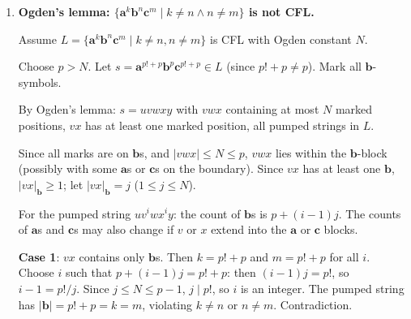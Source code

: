 \begin{enumerate}[{10.}1. ]
\begin{enumerate}
States $\{q_0,q_c,q_a,q_f\}$. Stack alphabet $\{Z,A\}$.

From $q_0$: if first symbol is $\pmb{c}$, go to $q_c$ (push $A$); if first is $\pmb{a}$, go to $q_a$ (push $A$).

$q_c$: push $A$ for each $\pmb{c}$; pop $A$ for each $\pmb{b}$; accept when stack has $Z$ and input done.

$q_a$: push $A$ for each $\pmb{a}$; when $\pmb{b}$ comes, pop two $A$s per $\pmb{b}$; accept when stack has $Z$ and input done.

\item Define $h: \{\pmb{a},\pmb{b},\pmb{c}\}^* \to \{\pmb{a},\pmb{b}\}^*$ by $h(\pmb{a})=\pmb{a}$, $h(\pmb{b})=\pmb{b}$, $h(\pmb{c})=\pmb{a}$. Then:
$h(\{\pmb{c}^n\pmb{b}^m\mid n=m\}) = \{\pmb{a}^n\pmb{b}^n\mid n\geq 1\}$ and $h(\{\pmb{a}^n\pmb{b}^m\mid n=2m\}) = \{\pmb{a}^n\pmb{b}^m\mid n=2m\}$.
$h(L) = \{\pmb{a}^n\pmb{b}^n\}\cup\{\pmb{a}^n\pmb{b}^m\mid n=2m\}$. This language is not a DCFL (it can be shown that any DPDA accepting it would have conflicting behavior on some strings).
\end{enumerate}

\item \textbf{Ogden's lemma: $\{\pmb{a}^k\pmb{b}^n\pmb{c}^m \mid k\neq n \wedge n\neq m\}$ is not CFL.}

Assume $L = \{\pmb{a}^k\pmb{b}^n\pmb{c}^m \mid k\neq n, n\neq m\}$ is CFL with Ogden constant $N$.

Choose $p > N$. Let $s = \pmb{a}^{p!+p}\pmb{b}^p\pmb{c}^{p!+p} \in L$ (since $p!+p \neq p$). Mark all $\pmb{b}$-symbols.

By Ogden's lemma: $s = uvwxy$ with $vwx$ containing at most $N$ marked positions, $vx$ has at least one marked position, all pumped strings in $L$.

Since all marks are on $\pmb{b}$s, and $|vwx|\leq N \leq p$, $vwx$ lies within the $\pmb{b}$-block (possibly with some $\pmb{a}$s or $\pmb{c}$s on the boundary). Since $vx$ has at least one $\pmb{b}$, $|vx|_{\pmb{b}} \geq 1$; let $|vx|_{\pmb{b}} = j$ ($1\leq j\leq N$).

For the pumped string $uv^i wx^i y$: the count of $\pmb{b}$s is $p + (i-1)j$. The counts of $\pmb{a}$s and $\pmb{c}$s may also change if $v$ or $x$ extend into the $\pmb{a}$ or $\pmb{c}$ blocks.

\textbf{Case 1}: $vx$ contains only $\pmb{b}$s. Then $k = p!+p$ and $m = p!+p$ for all $i$. Choose $i$ such that $p + (i-1)j = p!+p$: then $(i-1)j = p!$, so $i-1 = p!/j$. Since $j\leq N\leq p-1$, $j\mid p!$, so $i$ is an integer. The pumped string has $|\pmb{b}|=p!+p=k=m$, violating $k\neq n$ or $n\neq m$. Contradiction.


\end{enumerate}
